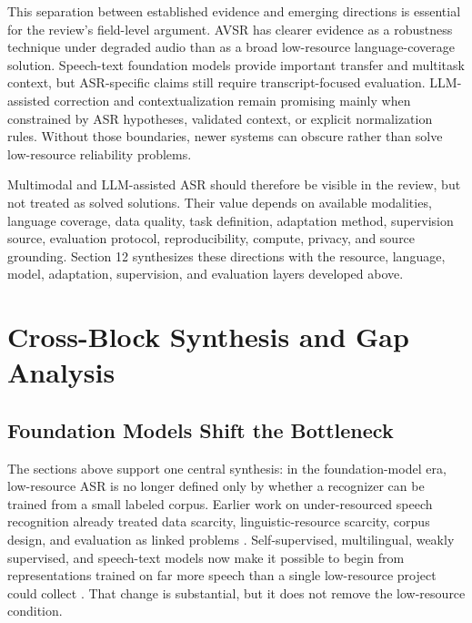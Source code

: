 \documentclass[pdflatex,sn-basic,iicol]{sn-jnl}
\theoremstyle{thmstyleone}
\theoremstyle{thmstyletwo}
\theoremstyle{thmstylethree}
\begin{document}
This separation between established evidence and emerging directions is essential for the review's field-level argument. AVSR has clearer evidence as a robustness technique under degraded audio than as a broad low-resource language-coverage solution. Speech-text foundation models provide important transfer and multitask context, but ASR-specific claims still require transcript-focused evaluation. LLM-assisted correction and contextualization remain promising mainly when constrained by ASR hypotheses, validated context, or explicit normalization rules. Without those boundaries, newer systems can obscure rather than solve low-resource reliability problems.

Multimodal and LLM-assisted ASR should therefore be visible in the review, but not treated as solved solutions. Their value depends on available modalities, language coverage, data quality, task definition, adaptation method, supervision source, evaluation protocol, reproducibility, compute, privacy, and source grounding. Section 12 synthesizes these directions with the resource, language, model, adaptation, supervision, and evaluation layers developed above.

\section{Cross-Block Synthesis and Gap Analysis}

\subsection{Foundation Models Shift the Bottleneck}

The sections above support one central synthesis: in the foundation-model era, low-resource ASR is no longer defined only by whether a recognizer can be trained from a small labeled corpus. Earlier work on under-resourced speech recognition already treated data scarcity, linguistic-resource scarcity, corpus design, and evaluation as linked problems \citep{besacier2014_underresourced_asr_survey,gales2014_babel_project_research_cued}. Self-supervised, multilingual, weakly supervised, and speech-text models now make it possible to begin from representations trained on far more speech than a single low-resource project could collect \citep{baevski2020wav2vec2,babu22_interspeech,pmlr-v202-radford23a,pratap2024mms,seamless2025_joint_speech_text_mt,tian25b_interspeech}. That change is substantial, but it does not remove the low-resource condition.
\end{document}
